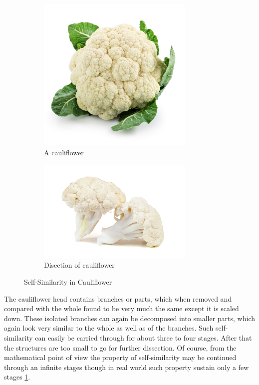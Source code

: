 	\begin{figure}
		\centering
		\captionsetup[subfigure]{width=0.9\textwidth}
		\begin{subfigure}[t]{.45\textwidth}
			\centering
			\includegraphics[width=7.5cm]{self-similarity/cauliflower.jpg}
			\caption{A cauliflower}
		\end{subfigure}
		\begin{subfigure}[t]{.45\textwidth}
			\centering
			\includegraphics[width=7.5cm]{self-similarity/cauliflower_disected}
			\caption{Disection of cauliflower}
		\end{subfigure}
		\caption{Self-Similarity in Cauliflower}
		\label{fig:cauliflower-self-similarity}
	\end{figure}
	
	The cauliflower head contains branches or parts, which	when removed and compared with the whole found to be very much	the same except it is scaled down. These isolated branches can again	be decomposed into smaller parts, which again look very similar to the	whole as well as of the branches. Such self-similarity can easily be carried through for about three to four stages. After that the structures are	too small to go for further dissection. Of course, from the mathematical	point of view the property of self-similarity may be continued through	an infinite stages though in real world such property sustain only a few	stages \ref{fig:cauliflower-self-similarity}.
	
